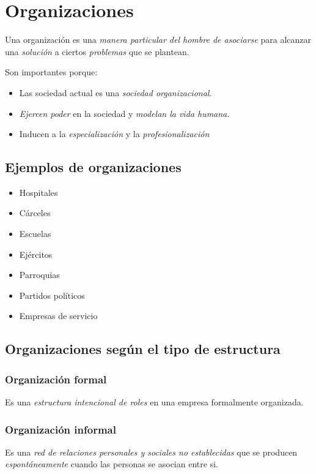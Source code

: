 \documentclass[spanish, twocolumn, twoside,openany]{book}
\begin{document}
\chapter{Organizaciones}

Una organización es una \emph{manera particular del hombre de asociarse} para alcanzar una \emph{solución} a ciertos \emph{problemas} que se plantean.

Son importantes porque:
\begin{itemize}
	\item Las sociedad actual es una \emph{sociedad organizacional}.
	\item \emph{Ejercen poder} en la sociedad y \emph{modelan la vida humana}.
	\item Inducen a la \emph{especialización} y la \emph{profesionalización}
\end{itemize}

\section{Ejemplos de organizaciones}
\begin{itemize}
	\item Hospitales
	\item Cárceles
	\item Escuelas
	\item Ejércitos
	\item Parroquias
	\item Partidos políticos
	\item Empresas de servicio
\end{itemize}

\section{Organizaciones según el tipo de estructura}

\subsection{Organización formal}
Es una \emph{estructura intencional de roles} en una empresa formalmente organizada.

\subsection{Organización informal}
Es una \emph{red de relaciones personales y sociales no establecidas} que se producen \emph{espontáneamente} cuando las personas se asocian entre si.
\end{document}
